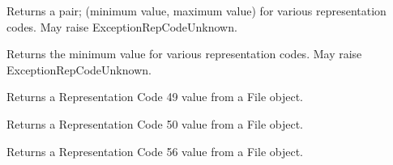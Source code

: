 \documentclass[letterpaper,10pt,english]{sphinxmanual}
\begin{document}

\begin{fulllineitems}
\label{\detokenize{ref/LIS/core/RepCode:TotalDepth.LIS.core.pRepCode.minMaxValue}}
Returns a pair; (minimum value, maximum value) for various
representation codes. May raise ExceptionRepCodeUnknown.

\end{fulllineitems}


\begin{fulllineitems}
\label{\detokenize{ref/LIS/core/RepCode:TotalDepth.LIS.core.pRepCode.minValue}}
Returns the minimum value for various representation codes.
May raise ExceptionRepCodeUnknown.

\end{fulllineitems}


\begin{fulllineitems}
\label{\detokenize{ref/LIS/core/RepCode:TotalDepth.LIS.core.pRepCode.read49}}
Returns a Representation Code 49 value from a File object.

\end{fulllineitems}


\begin{fulllineitems}
\label{\detokenize{ref/LIS/core/RepCode:TotalDepth.LIS.core.pRepCode.read50}}
Returns a Representation Code 50 value from a File object.

\end{fulllineitems}


\begin{fulllineitems}
\label{\detokenize{ref/LIS/core/RepCode:TotalDepth.LIS.core.pRepCode.read56}}
Returns a Representation Code 56 value from a File object.

\end{fulllineitems}
\end{document}
